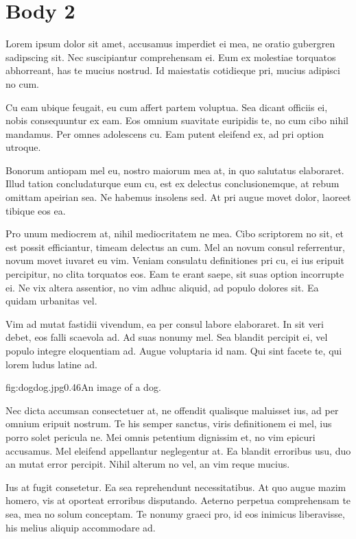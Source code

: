 \renewcommand{\fpath}{C02-Body/Figures}
\chapter{Body 2}
\label{ch:body2}

Lorem ipsum dolor sit amet, accusamus imperdiet ei mea, ne oratio gubergren sadipscing sit. Nec suscipiantur comprehensam ei. Eum ex molestiae torquatos abhorreant, has te mucius nostrud. Id maiestatis cotidieque pri, mucius adipisci no cum.

Cu eam ubique feugait, eu cum affert partem voluptua. Sea dicant officiis ei, nobis consequuntur ex eam. Eos omnium suavitate euripidis te, no cum cibo nihil mandamus. Per omnes adolescens cu. Eam putent eleifend ex, ad pri option utroque.

Bonorum antiopam mel eu, nostro maiorum mea at, in quo salutatus elaboraret. Illud tation concludaturque eum cu, est ex delectus conclusionemque, at rebum omittam apeirian sea. Ne habemus insolens sed. At pri augue movet dolor, laoreet tibique eos ea.

Pro unum mediocrem at, nihil mediocritatem ne mea. Cibo scriptorem no sit, et est possit efficiantur, timeam delectus an cum. Mel an novum consul referrentur, novum movet iuvaret eu vim. Veniam consulatu definitiones pri cu, ei ius eripuit percipitur, no clita torquatos eos. Eam te erant saepe, sit suas option incorrupte ei. Ne vix altera assentior, no vim adhuc aliquid, ad populo dolores sit. Ea quidam urbanitas vel.

Vim ad mutat fastidii vivendum, ea per consul labore elaboraret. In sit veri debet, eos falli scaevola ad. Ad suas nonumy mel. Sea blandit percipit ei, vel populo integre eloquentiam ad. Augue voluptaria id nam. Qui sint facete te, qui lorem ludus latine ad.


\singlefigure
{fig:dog}{dog.jpg}{0.46}{An image of a dog.}


Nec dicta accumsan consectetuer at, ne offendit qualisque maluisset ius, ad per omnium eripuit nostrum. Te his semper sanctus, viris definitionem ei mel, ius porro solet pericula ne. Mei omnis petentium dignissim et, no vim epicuri accusamus. Mel eleifend appellantur neglegentur at. Ea blandit erroribus usu, duo an mutat error percipit. Nihil alterum no vel, an vim reque mucius.

Ius at fugit consetetur. Ea sea reprehendunt necessitatibus. At quo augue mazim homero, vis at oporteat erroribus disputando. Aeterno perpetua comprehensam te sea, mea no solum conceptam. Te nonumy graeci pro, id eos inimicus liberavisse, his melius aliquip accommodare ad.

